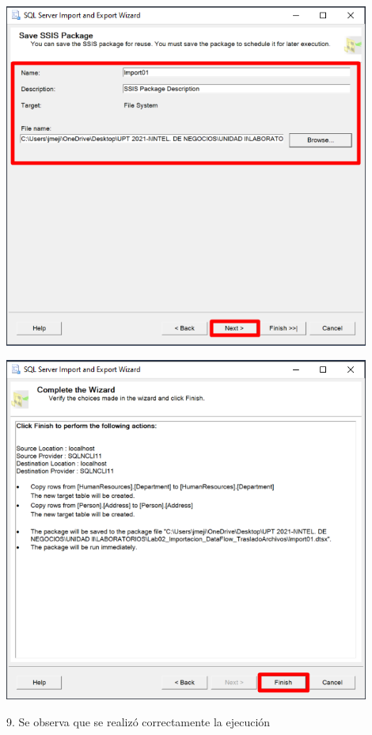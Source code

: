 \documentclass[12pt,letterpaper]{article}
\begin{document}
	\begin{center}
	\includegraphics[width=12cm]{./img/9}
	\end{center}	
	\begin{center}
	\includegraphics[width=12cm]{./img/10}
	\end{center}		
9. Se observa que se realizó correctamente  la ejecución
\end{document}
